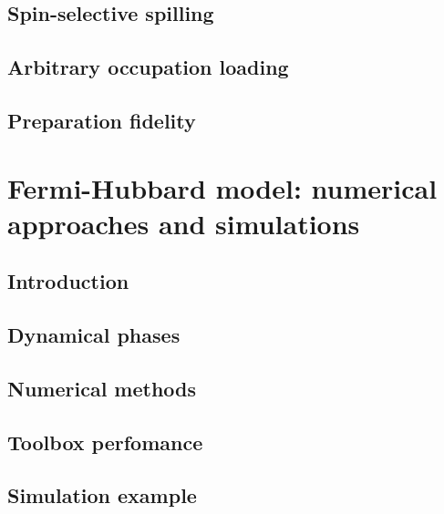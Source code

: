 \documentclass[twoside]{article}
\begin{document}
\subsection{Spin-selective spilling} \label{subsec:spin-selective-spilling}


\subsection{Arbitrary occupation loading} \label{subsec:arbitrary-occupation-loading}


\subsection{Preparation fidelity} \label{subsec:prep-fidelity}


\newpage
\section{Fermi-Hubbard model: numerical approaches and simulations} \label{sec:fhmodel}

\subsection{Introduction}

\subsection{Dynamical phases}

\subsection{Numerical methods}

\subsection{Toolbox perfomance}

\subsection{Simulation example}
\end{document}
